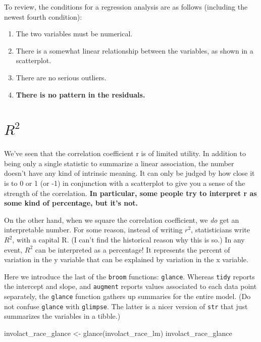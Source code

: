 \documentclass[
]{book}
\newenvironment{Shaded}{\begin{snugshade}}{\end{snugshade}}
\newcommand{\FunctionTok}[1]{\textcolor[rgb]{0.00,0.00,0.00}{#1}}
\newcommand{\NormalTok}[1]{#1}
\newcommand{\OtherTok}[1]{\textcolor[rgb]{0.56,0.35,0.01}{#1}}
\providecommand{\tightlist}{%
  \setlength{\itemsep}{0pt}\setlength{\parskip}{0pt}}
\begin{document}
To review, the conditions for a regression analysis are as follows (including the newest fourth condition):

\begin{enumerate}
\def\labelenumi{\arabic{enumi}.}
\tightlist
\item
  The two variables must be numerical.
\item
  There is a somewhat linear relationship between the variables, as shown in a scatterplot.
\item
  There are no serious outliers.
\item
  \textbf{There is no pattern in the residuals.}
\end{enumerate}

\hypertarget{regression-r2}{%
\section{\texorpdfstring{\(R^2\)}{R\^{}2}}\label{regression-r2}}

We've seen that the correlation coefficient r is of limited utility. In addition to being only a single statistic to summarize a linear association, the number doesn't have any kind of intrinsic meaning. It can only be judged by how close it is to 0 or 1 (or -1) in conjunction with a scatterplot to give you a sense of the strength of the correlation. \textbf{In particular, some people try to interpret r as some kind of percentage, but it's not.}

On the other hand, when we square the correlation coefficient, we \emph{do} get an interpretable number. For some reason, instead of writing \(r^2\), statisticians write \(R^2\), with a capital R. (I can't find the historical reason why this is so.) In any event, \(R^2\) can be interpreted as a percentage! It represents the percent of variation in the y variable that can be explained by variation in the x variable.

Here we introduce the last of the \texttt{broom} functions: \texttt{glance}. Whereas \texttt{tidy} reports the intercept and slope, and \texttt{augment} reports values associated to each data point separately, the \texttt{glance} function gathers up summaries for the entire model. (Do not confuse \texttt{glance} with \texttt{glimpse}. The latter is a nicer version of \texttt{str} that just summarizes the variables in a tibble.)

\begin{Shaded}
\begin{Highlighting}[]
\NormalTok{involact\_race\_glance }\OtherTok{\textless{}{-}} \FunctionTok{glance}\NormalTok{(involact\_race\_lm)}
\NormalTok{involact\_race\_glance}
\end{Highlighting}
\end{Shaded}
\end{document}
